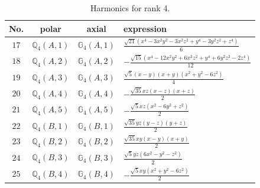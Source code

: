 \documentclass[fleqn,8pt,landscape]{jsarticle}
\begin{document}
\begin{table}[ht!]
\begin{center}
\caption{Harmonics for rank 4.}
\renewcommand{\arraystretch}{1.3}
\begin{tabular}{cccl} \hline \hline
No. & polar & axial & expression \\ \hline
$ 17 $ & $ \mathbb{Q}_{4}(A,1) $ & $ \mathbb{G}_{4}(A,1) $ & $ \frac{\sqrt{21} \left(x^{4} - 3 x^{2} y^{2} - 3 x^{2} z^{2} + y^{4} - 3 y^{2} z^{2} + z^{4}\right)}{6} $ \\
$ 18 $ & $ \mathbb{Q}_{4}(A,2) $ & $ \mathbb{G}_{4}(A,2) $ & $ - \frac{\sqrt{15} \left(x^{4} - 12 x^{2} y^{2} + 6 x^{2} z^{2} + y^{4} + 6 y^{2} z^{2} - 2 z^{4}\right)}{12} $ \\
$ 19 $ & $ \mathbb{Q}_{4}(A,3) $ & $ \mathbb{G}_{4}(A,3) $ & $ \frac{\sqrt{5} \left(x - y\right) \left(x + y\right) \left(x^{2} + y^{2} - 6 z^{2}\right)}{4} $ \\
$ 20 $ & $ \mathbb{Q}_{4}(A,4) $ & $ \mathbb{G}_{4}(A,4) $ & $ - \frac{\sqrt{35} x z \left(x - z\right) \left(x + z\right)}{2} $ \\
$ 21 $ & $ \mathbb{Q}_{4}(A,5) $ & $ \mathbb{G}_{4}(A,5) $ & $ - \frac{\sqrt{5} x z \left(x^{2} - 6 y^{2} + z^{2}\right)}{2} $ \\
$ 22 $ & $ \mathbb{Q}_{4}(B,1) $ & $ \mathbb{G}_{4}(B,1) $ & $ \frac{\sqrt{35} y z \left(y - z\right) \left(y + z\right)}{2} $ \\
$ 23 $ & $ \mathbb{Q}_{4}(B,2) $ & $ \mathbb{G}_{4}(B,2) $ & $ \frac{\sqrt{35} x y \left(x - y\right) \left(x + y\right)}{2} $ \\
$ 24 $ & $ \mathbb{Q}_{4}(B,3) $ & $ \mathbb{G}_{4}(B,3) $ & $ \frac{\sqrt{5} y z \left(6 x^{2} - y^{2} - z^{2}\right)}{2} $ \\
$ 25 $ & $ \mathbb{Q}_{4}(B,4) $ & $ \mathbb{G}_{4}(B,4) $ & $ - \frac{\sqrt{5} x y \left(x^{2} + y^{2} - 6 z^{2}\right)}{2} $ \\
 \hline \hline
\end{tabular}
\end{center}
\end{table}
\end{document}
